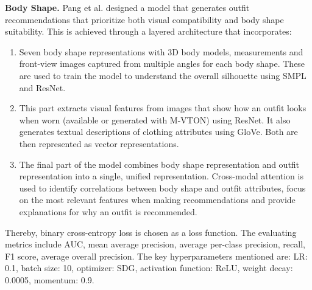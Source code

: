 \vspace{5mm}

\textbf{Body Shape.}
Pang et al. designed a model that generates outfit recommendations that prioritize both visual compatibility and body shape suitability. This is achieved through a layered architecture that incorporates: \cite[vgl.]{pang_learning_2024}
\begin{enumerate}
  \item Seven body shape representations with 3D body models, measurements and front-view images captured from multiple angles for each body shape. These are used to train the model to understand the overall silhouette using \acs{SMPL} and \acs{ResNet}.
  \item This part extracts visual features from images that show how an outfit looks when worn (available or generated with M-VTON) using \acs{ResNet}. It also generates textual descriptions of clothing attributes using \acs{GloVe}. Both are then represented as vector representations.
  \item The final part of the model combines body shape representation and outfit representation into a single, unified representation. Cross-modal attention is used to identify correlations between body shape and outfit attributes, focus on the most relevant features when making recommendations and provide explanations for why an outfit is recommended.
\end{enumerate}
Thereby, binary cross-entropy loss is chosen as a loss function. The evaluating metrics include \acs{AUC}, mean average precision, average per-class precision, recall, F1 score, average overall precision. The key hyperparameters mentioned are: \acs{LR}: 0.1, batch size: 10, optimizer: SDG, activation function: \acs{ReLU}, weight decay: 0.0005, momentum: 0.9. \cite[vgl.]{pang_learning_2024}

\vspace{5mm}

